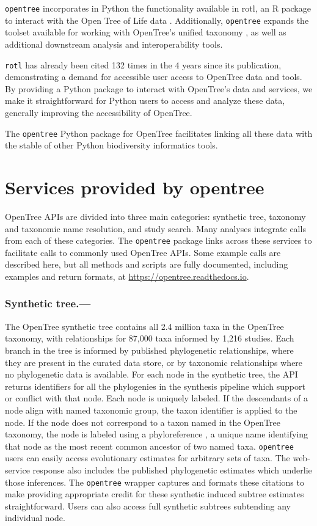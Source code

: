\documentclass[oupdraft]{sysbio_sse}
\begin{document}
\texttt{opentree} incorporates in Python the functionality available in rotl, an {R} package to interact with the Open Tree of Life data \citep{michonneau_rotl_2016}.
Additionally, \texttt{opentree} expands the toolset available for working with OpenTree's unified taxonomy \citep{rees_automated_2017}, as well as additional downstream analysis and interoperability tools.

\texttt{rotl} has already been cited 132 times in the 4 years since its publication, demonstrating a demand for accessible user access to OpenTree data and tools.
By providing a Python package to interact with OpenTree's data and services, we make it straightforward for Python users to access and analyze these data,
generally improving the accessibility of OpenTree.

The \texttt{opentree} Python package for OpenTree facilitates linking all these data with the stable of other Python biodiversity informatics tools.



\bigskip
\section{Services provided by opentree}
\label{sec3}


OpenTree APIs are divided into three main categories: synthetic tree, taxonomy and taxonomic name resolution, and study search.
Many analyses integrate calls from each of these categories.
The \texttt{opentree} package links across these services to facilitate calls to commonly used OpenTree APIs.
Some example calls are described here, but all methods and scripts are fully documented, including examples and return formats, at \url{https://opentree.readthedocs.io}.

\subsubsection{Synthetic tree.---} The OpenTree synthetic tree contains all 2.4 million taxa in the OpenTree taxonomy, with relationships for 87,000 taxa informed by 1,216 studies.
Each branch in the tree is informed by published phylogenetic relationships, where they are present in the curated data store, or by taxonomic relationships where no phylogenetic data is available.
For each node in the synthetic tree, the API returns identifiers for
all the phylogenies in the synthesis pipeline which support or conflict with that node.
Each node is uniquely labeled.
If the descendants of a node align with named taxonomic group, the taxon identifier is applied to the node.
If the node does not correspond to a taxon named in the OpenTree taxonomy, the node is labeled using a phyloreference \citep{parr_evolutionary_2012}, a unique name identifying that node as the most recent common ancestor of two named taxa.
\texttt{opentree} users can easily access evolutionary estimates for arbitrary sets of taxa.
The web-service response also includes the published phylogenetic estimates which underlie those inferences.
The \texttt{opentree} wrapper captures and formats these citations to make providing appropriate credit for these synthetic induced subtree estimates straightforward.
Users can also access full synthetic subtrees subtending any individual node.
\end{document}
